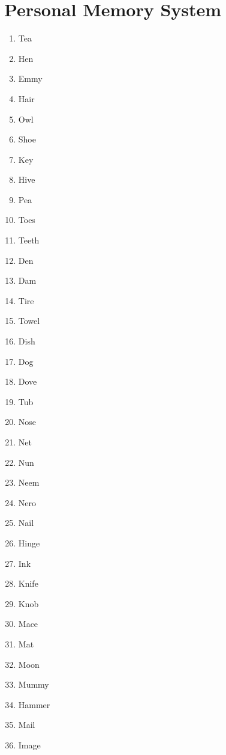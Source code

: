 
\chapter*{Personal Memory System}



   \begin{enumerate}
       \item  Tea
       \item  Hen
       \item  Emmy
       \item  Hair
       \item  Owl
       \item  Shoe
       \item  Key
       \item  Hive
       \item  Pea
       \item  Toes
       \item  Teeth
       \item  Den
       \item  Dam
       \item  Tire
       \item  Towel
       \item  Dish
       \item  Dog
       \item  Dove
       \item  Tub
       \item  Nose
       \item  Net
       \item  Nun
       \item  Neem
       \item  Nero
       \item  Nail
       \item  Hinge
       \item  Ink
       \item  Knife
       \item  Knob
       \item  Mace
       \item  Mat
       \item  Moon
       \item  Mummy
       \item  Hammer
       \item  Mail
       \item  Image

\end{enumerate}
